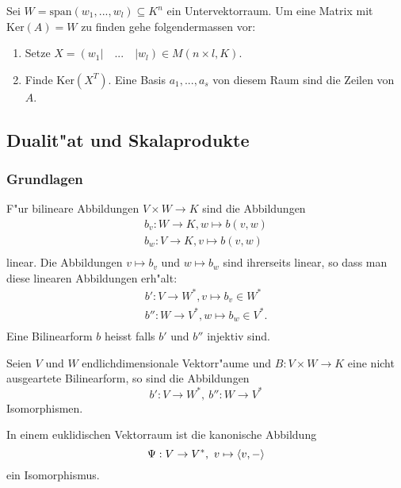 \documentclass[9pt, a4paper, twocolumn, landscape]{article}
\begin{document}
\begin{remark}
Sei $W = \mathrm{span}(w_1, ..., w_l) \subseteq K^n$ ein Untervektorraum. Um eine Matrix mit $\mathrm{Ker}(A) = W$ zu finden gehe folgendermassen vor:
\begin{enumerate}
\item Setze $X = (w_1| \quad ... \quad | w_l) \in M(n \times l, K)$.
\item Finde $\mathrm{Ker}(X^T)$. Eine Basis $a_1, ..., a_s$ von diesem Raum sind die Zeilen von $A$.
\end{enumerate}
\end{remark}

\subsection{Dualit"at und Skalaprodukte}
\subsubsection{Grundlagen}
\begin{definition}
F"ur bilineare Abbildungen $V \times W \rightarrow K$ sind die Abbildungen
\begin{gather*}
b_v : W \rightarrow K, w \mapsto b(v, w)\\
b_w : V \rightarrow K, v \mapsto b(v, w)\\
\end{gather*}
linear. Die Abbildungen $v \mapsto b_v$ und $w \mapsto b_w$ sind ihrerseits linear, so dass man diese linearen Abbildungen erh"alt:
\begin{gather*}
b ' : V \rightarrow W^*, v \mapsto b_v \in W^* \\
b '' : W \rightarrow V^*, w \mapsto b_w \in V^*. \\
\end{gather*}
Eine Bilinearform $b$ heisst  falls $b'$ und $b''$ injektiv sind.
\end{definition}

\begin{theorem}
Seien $V$ und $W$ endlichdimensionale Vektorr"aume und $B : V \times W \rightarrow K$ eine nicht ausgeartete Bilinearform, so sind die Abbildungen 
$$
b': V \rightarrow W^*, \ b'':W \rightarrow V^*
$$
Isomorphismen.
\end{theorem}



\begin{corollary}
In einem euklidischen Vektorraum ist die kanonische Abbildung
$$
\Psi : V \rightarrow V^*, \ 
v \mapsto \scp{v}{-}
$$
ein Isomorphismus.
\end{corollary}
\end{document}

